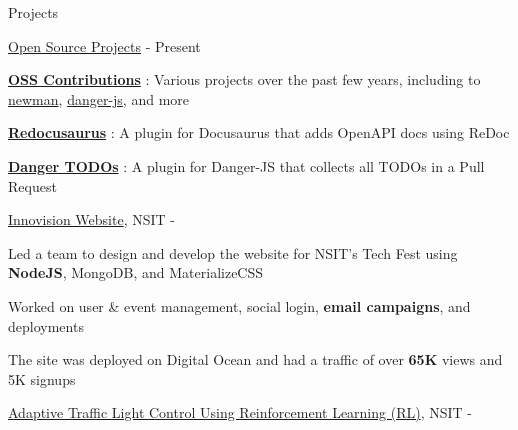\documentclass[../resume.tex]{subfiles}
\begin{document}
\begin{rSection}{Projects}

\begin{rSubsection}
    {\href{https://github.com/rohit-gohri}{Open Source Projects}}
    {  - Present }
    {}{}

    \item \href{https://rohit.page/contributions/?utm_source=resume&utm_medium=oss&utm_campaign=hf}{\textbf{OSS Contributions}}
        : Various projects over the past few years, including to 
        \href{https://rohit.page/contributions/#oss-postmanlabs/newman?utm_source=resume&utm_medium=oss-newman&utm_campaign=hf}{newman},
        \href{https://rohit.page/contributions/#oss-danger/danger-js?utm_source=resume&utm_medium=oss-newman&utm_campaign=hf}{danger-js}, and more
    \item \href{https://rohit.page/blog/projects/openapi-for-docusaurus/?utm_source=resume&utm_medium=redoc&utm_campaign=hf}{\textbf{Redocusaurus}}
        : A plugin for Docusaurus that adds OpenAPI docs using ReDoc
    \item \href{https://rohit.page/blog/projects/dangerjs-plugin-todos/?utm_source=resume&utm_medium=danger&utm_campaign=hf}{\textbf{Danger TODOs}}
        : A plugin for Danger-JS that collects all TODOs in a Pull Request

\end{rSubsection}

\begin{rSubsection}
    {\href{https://github.com/rohit-gohri/inno}{Innovision Website}, {\nem NSIT}}
    {  -  }
    {}{}

    \item Led a team to design and develop the website for NSIT’s Tech Fest using \textbf{NodeJS}, MongoDB, and MaterializeCSS
    \item Worked on user \& event management, social login, \textbf{email campaigns}, and deployments
    \item The site was deployed on Digital Ocean and had a traffic of over \textbf{65K} views and 5K signups

\end{rSubsection}

\begin{rSubsection}
    {\href{https://github.com/rohit-gohri/trafficRL}{Adaptive Traffic Light Control Using Reinforcement Learning (RL)}, {\nem NSIT}}
    {  -  }
    {}{}


\end{rSubsection}
\end{rSection}
\end{document}
